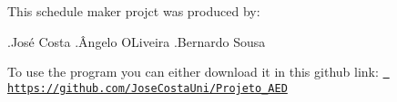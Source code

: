 This schedule maker projct was produced by\+:

.José Costa .Ângelo OLiveira .Bernardo Sousa

To use the program you can either download it in this github link\+: \href{https://github.com/JoseCostaUni/Projeto_AED}{\texttt{ https\+://github.\+com/\+Jose\+Costa\+Uni/\+Projeto\+\_\+\+AED}} 